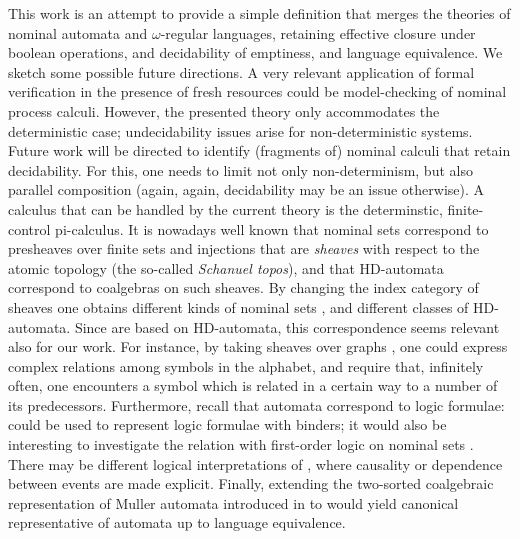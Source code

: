 This work is an attempt to provide a simple definition that merges the theories of nominal automata and $\omega$-regular languages, retaining effective closure under boolean operations, and decidability of emptiness, and language equivalence. We sketch some possible future directions. A very relevant application of formal verification in the presence of fresh resources could be model-checking of nominal process calculi. However, the presented theory only accommodates the deterministic case; undecidability issues arise for non-deterministic systems. Future work will be directed to identify (fragments of) nominal calculi that retain decidability. For this, one needs to limit not only non-determinism, but also parallel composition (again, again, decidability may be an issue otherwise). A calculus that can be handled by the current theory is the determinstic, finite-control pi-calculus. It is nowadays well known that nominal sets correspond to presheaves over finite sets and injections that are \emph{sheaves} with respect to the atomic topology (the so-called \emph{Schanuel topos}), and that HD-automata correspond to coalgebras on such sheaves. By changing the index category of sheaves one obtains different kinds of nominal sets \cite{CianciaKM10}, and different classes of HD-automata. Since \hdmas{} are based on HD-automata, this correspondence seems relevant also for our work. For instance, by taking sheaves over graphs \cite{SammartinoPhD}, one could express complex relations among symbols in the alphabet, and require that, infinitely often, one encounters a symbol which is related in a certain way to a number of its predecessors. Furthermore, recall that automata correspond to logic formulae: \hdmas{} could be used to represent logic formulae with binders; it would also be interesting to investigate the relation with first-order logic on nominal sets \cite{Bojanczyk13}. There may be different logical interpretations of \hdmas, where causality or dependence \cite{Vnnen07,Galliani12} between events are made explicit. Finally, extending the two-sorted coalgebraic representation of Muller automata introduced in \cite{CV12} to \hdmas{} would yield canonical representative of automata up to language equivalence.



